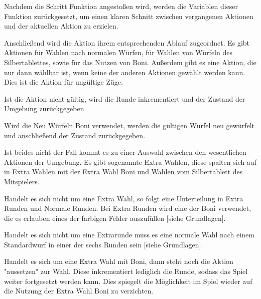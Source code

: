 Nachdem die Schritt Funktion angestoßen wird, werden die Variablen dieser Funktion zurückgesetzt, um einen klaren Schnitt zwischen vergangenen Aktionen und der aktuellen Aktion zu erzielen.

Anschließend wird die Aktion ihrem entsprechenden Ablauf zugeordnet. Es gibt Aktionen für Wahlen nach normalen Würfen, für Wahlen von Würfeln des Silbertablettes, sowie für das Nutzen von Boni. Außerdem gibt es eine Aktion, die nur dann wählbar ist, wenn keine der anderen Aktionen gewählt werden kann. Dies ist die Aktion für ungültige Züge.

Ist die Aktion nicht gültig, wird die Runde inkrementiert und der Zustand der Umgebung zurückgegeben.

Wird die Neu Würfeln Boni verwendet, werden die gültigen Würfel neu gewürfelt und anschließend der Zustand zurückgegeben.

Ist beides nicht der Fall kommt es zu einer Auswahl zwischen den wesentlichen Aktionen der Umgebung. Es gibt sogenannte Extra Wahlen, diese spalten sich auf in Extra Wahlen mit der Extra Wahl Boni und Wahlen vom Silbertablett des Mitspielers.

Handelt es sich nicht um eine Extra Wahl, so folgt eine Unterteilung in Extra Runden und Normale Runden. Bei Extra Runden wird eine der Boni verwendet, die es erlauben eines der farbigen Felder auszufüllen [siehe Grundlagen].

Handelt es sich nicht um eine Extrarunde muss es eine normale Wahl nach einem Standardwurf in einer der sechs Runden sein [siehe Grundlagen].

Handelt es sich um eine Extra Wahl mit Boni, dann steht noch die Aktion "aussetzen" zur Wahl. Diese inkrementiert lediglich die Runde, sodass das Spiel weiter fortgesetzt werden kann. Dies spiegelt die Möglichkeit im Spiel wieder auf die Nutzung der Extra Wahl Boni zu verzichten.\\

